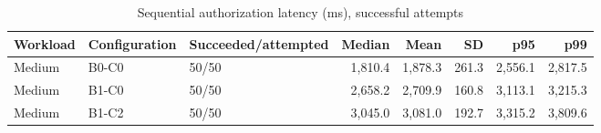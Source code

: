 \begin{table}[htbp]
\centering
\caption{Sequential authorization latency (ms), successful attempts}
\label{tab:evaluation-latency}
\begin{tabular}{lllrrrrr}
\hline
Workload & Configuration & Succeeded/attempted & Median & Mean & SD & p95 & p99 \\
\hline
Medium & B0-C0 & 50/50 & 1{,}810.4 & 1{,}878.3 & 261.3 & 2{,}556.1 & 2{,}817.5 \\
Medium & B1-C0 & 50/50 & 2{,}658.2 & 2{,}709.9 & 160.8 & 3{,}113.1 & 3{,}215.3 \\
Medium & B1-C2 & 50/50 & 3{,}045.0 & 3{,}081.0 & 192.7 & 3{,}315.2 & 3{,}809.6 \\
\hline
\end{tabular}
\par{}
\end{table}
